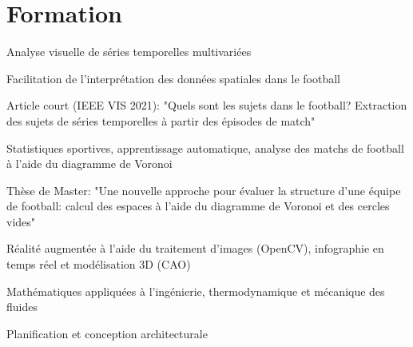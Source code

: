 \section{Formation}

 
\begin{tightemize}
\item Analyse visuelle de séries temporelles multivariées
\item Facilitation de l'interprétation des données spatiales dans le football
\item Article court (IEEE VIS 2021): "Quels sont les sujets dans le football? Extraction des sujets de séries temporelles à partir des épisodes de match"
\end{tightemize}

\sectionsep

 
\begin{tightemize}
\item Statistiques sportives, apprentissage automatique, analyse des matchs de football à l'aide du diagramme de Voronoi
\item Thèse de Master: "Une nouvelle approche pour évaluer la structure d'une équipe de football: calcul des espaces à l'aide du diagramme de Voronoi et des cercles vides"
\end{tightemize}

\sectionsep

 
\begin{tightemize}
\item Réalité augmentée à l'aide du traitement d'images (OpenCV), infographie en temps réel et modélisation 3D (CAO)
\end{tightemize}

\sectionsep

 
\begin{tightemize}
\item Mathématiques appliquées à l'ingénierie, thermodynamique et mécanique des fluides
\item Planification et conception architecturale
\end{tightemize}

\sectionsep

\vspace{3mm}